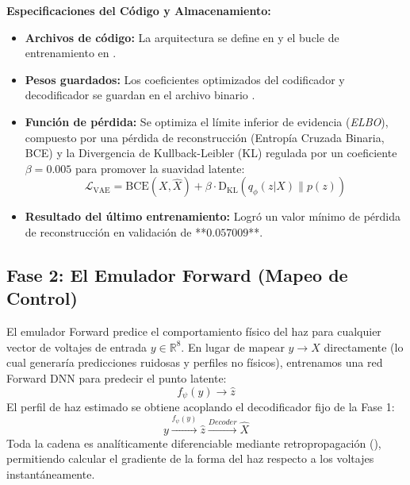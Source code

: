 \documentclass[12pt,letterpaper]{article}
\begin{document}
\textbf{Especificaciones del Código y Almacenamiento:}
\begin{itemize}
    \item \textbf{Archivos de código:} La arquitectura se define en  y el bucle de entrenamiento en .
    \item \textbf{Pesos guardados:} Los coeficientes optimizados del codificador y decodificador se guardan en el archivo binario .
    \item \textbf{Función de pérdida:} Se optimiza el límite inferior de evidencia (\textit{ELBO}), compuesto por una pérdida de reconstrucción (Entropía Cruzada Binaria, BCE) y la Divergencia de Kullback-Leibler (KL) regulada por un coeficiente $\beta = 0.005$ para promover la suavidad latente:
    \begin{equation}
        \mathcal{L}_{\text{VAE}} = \text{BCE}(X, \hat{X}) + \beta \cdot \text{D}_{\text{KL}}(q_\phi(z|X) \parallel p(z))
    \end{equation}
    \item \textbf{Resultado del último entrenamiento:} Logró un valor mínimo de pérdida de reconstrucción en validación de **$0.057009$**.
\end{itemize}

\subsection{Fase 2: El Emulador Forward (Mapeo de Control)}
El emulador Forward predice el comportamiento físico del haz para cualquier vector de voltajes de entrada $y \in \mathbb{R}^8$. En lugar de mapear $y \rightarrow X$ directamente (lo cual generaría predicciones ruidosas y perfiles no físicos), entrenamos una red Forward DNN para predecir el punto latente:
\begin{equation}
    f_\psi(y) \rightarrow \hat{z}
\end{equation}
El perfil de haz estimado se obtiene acoplando el decodificador fijo de la Fase 1:
\begin{equation}
    y \xrightarrow{f_\psi(y)} \hat{z} \xrightarrow{Decoder} \hat{X}
\end{equation}
Toda la cadena es analíticamente diferenciable mediante retropropagación (), permitiendo calcular el gradiente de la forma del haz respecto a los voltajes instantáneamente.
\end{document}
